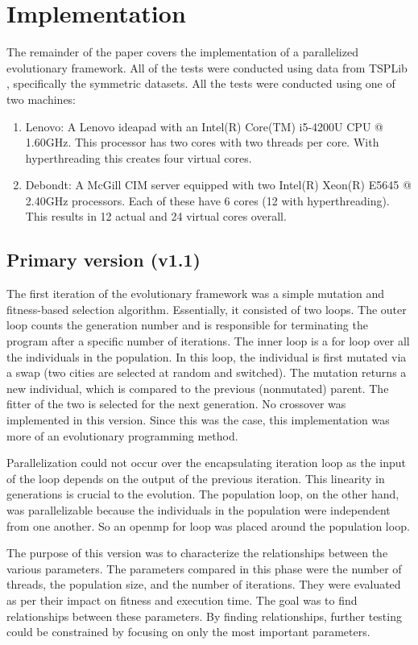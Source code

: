 \documentclass[10pt,letterpaper]{article}
\begin{document}
\section{Implementation} \label{sec:implementation}
The remainder of the paper covers the implementation of a parallelized evolutionary framework. All of the tests were conducted using data from TSPLib \cite{tsplib}, specifically the symmetric datasets. All the tests were conducted using one of two machines:
\begin{enumerate}
\item Lenovo: A Lenovo ideapad with an Intel(R) Core(TM) i5-4200U CPU @ 1.60GHz. This processor has two cores with two threads per core. With hyperthreading this creates four virtual cores.
\item Debondt: A McGill CIM server equipped with two Intel(R) Xeon(R) E5645 @ 2.40GHz processors. Each of these have 6 cores (12 with hyperthreading). This results in 12 actual and 24 virtual cores overall.
\end{enumerate}

\subsection{Primary version (v1.1)}
The first iteration of the evolutionary framework was a simple mutation and fitness-based selection algorithm. Essentially, it consisted of two loops. The outer loop counts the generation number and is responsible for terminating the program after a specific number of iterations. The inner loop is a for loop over all the individuals in the population. In this loop, the individual is first mutated via a swap (two cities are selected at random and switched). The mutation returns a new individual, which is compared to the previous (nonmutated) parent. The fitter of the two is selected for the next generation. No crossover was implemented in this version. Since this was the case, this implementation was more of an evolutionary programming method.

Parallelization could not occur over the encapsulating iteration loop as the input of the loop depends on the output of the previous iteration. This linearity in generations is crucial to the evolution. The population loop, on the other hand, was parallelizable because the individuals in the population were independent from one another. So an openmp for loop was placed around the population loop.

The purpose of this version was to characterize the relationships between the various parameters. The parameters compared in this phase were the number of threads, the population size, and the number of iterations. They were evaluated as per their impact on fitness and execution time. The goal was to find relationships between these parameters. By finding relationships, further testing could be constrained by focusing on only the most important parameters.
\end{document}
